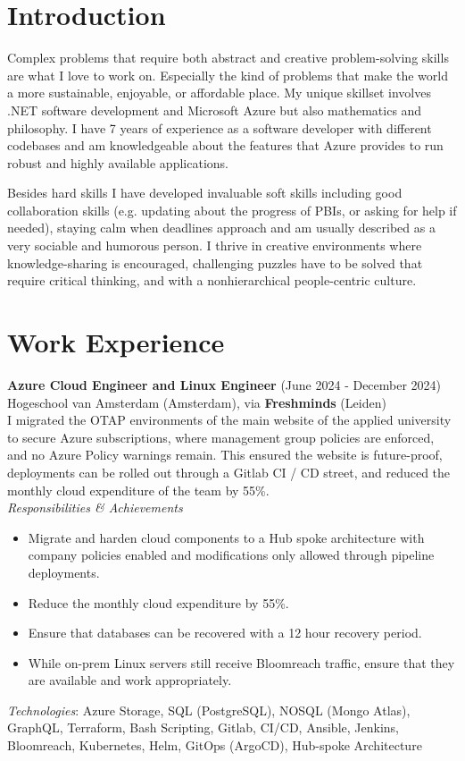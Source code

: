 \documentclass[a4paper,8pt]{article}
\begin{document}
\section{Introduction}
Complex problems that require both abstract and creative problem-solving skills are what I love to work on. Especially the kind of problems that make the world a more sustainable, enjoyable, or affordable place. My unique skillset involves .NET software development and Microsoft Azure but also mathematics and philosophy. I have 7 years of experience as a software developer with different codebases and am knowledgeable about the features that Azure provides to run robust and highly available applications. 

\noindent
Besides hard skills I have developed invaluable soft skills including good collaboration skills (e.g. updating about the progress of PBIs, or asking for help if needed), staying calm when deadlines approach and am usually described as a very sociable and humorous person. I thrive in creative environments where knowledge-sharing is encouraged, challenging puzzles have to be solved that require critical thinking, and with a nonhierarchical people-centric culture. 

\section{Work Experience}
\textbf{Azure Cloud Engineer and Linux Engineer} (June 2024 - December 2024) \\
Hogeschool van Amsterdam (Amsterdam), via \textbf{Freshminds} (Leiden) \\
I migrated the OTAP environments of the main website of the applied university to secure Azure subscriptions, 
 where management group policies are enforced, and no Azure Policy warnings remain.
 This ensured the website is future-proof,
deployments can be rolled out through a Gitlab CI / CD street, and reduced the monthly cloud expenditure of the team by 55\%. \\
\textit{Responsibilities \& Achievements}
\begin{itemize}
\item Migrate and harden cloud components to a Hub spoke architecture with company policies enabled and modifications only allowed through pipeline deployments.
\item Reduce the monthly cloud expenditure by 55\%.
\item Ensure that databases can be recovered with a 12 hour recovery period.
\item While on-prem Linux servers still receive Bloomreach traffic, ensure that they are available and work appropriately.
\end{itemize}
\textit{Technologies}: Azure Storage, SQL (PostgreSQL), NOSQL (Mongo Atlas),  GraphQL, Terraform, Bash Scripting, Gitlab, CI/CD, Ansible, Jenkins, Bloomreach,
Kubernetes, Helm, GitOps (ArgoCD), Hub-spoke Architecture
\end{document}
